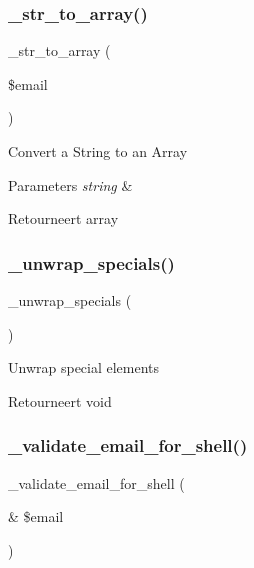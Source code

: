 \subsubsection{\texorpdfstring{\_str\_to\_array()}{\_str\_to\_array()}}
{\footnotesize\ttfamily \+\_\+str\+\_\+to\+\_\+array (\begin{DoxyParamCaption}\item[{}]{\$email }\end{DoxyParamCaption})\hspace{0.3cm}{\ttfamily [protected]}}

Convert a String to an Array


\begin{DoxyParams}{Parameters}
{\em string} & \\
\hline
\end{DoxyParams}
\begin{DoxyReturn}{Retourneert}
array 
\end{DoxyReturn}
\mbox{\label{class_c_i___email_af50bcab235f0eff47d7117d77733f1d9}} 
\subsubsection{\texorpdfstring{\_unwrap\_specials()}{\_unwrap\_specials()}}
{\footnotesize\ttfamily \+\_\+unwrap\+\_\+specials (\begin{DoxyParamCaption}{ }\end{DoxyParamCaption})\hspace{0.3cm}{\ttfamily [protected]}}

Unwrap special elements

\begin{DoxyReturn}{Retourneert}
void 
\end{DoxyReturn}
\mbox{\label{class_c_i___email_a468f4ab8b122318d39baffe9e727d2be}} 
\subsubsection{\texorpdfstring{\_validate\_email\_for\_shell()}{\_validate\_email\_for\_shell()}}
{\footnotesize\ttfamily \+\_\+validate\+\_\+email\+\_\+for\+\_\+shell (\begin{DoxyParamCaption}\item[{\&}]{\$email }\end{DoxyParamCaption})\hspace{0.3cm}{\ttfamily [protected]}}

